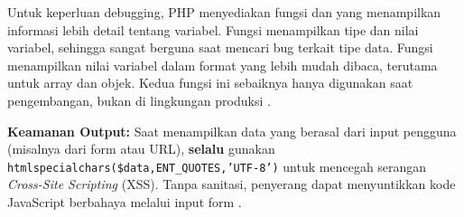 Untuk keperluan debugging, PHP menyediakan fungsi  dan  yang menampilkan informasi lebih detail tentang variabel. Fungsi  menampilkan tipe dan nilai variabel, sehingga sangat berguna saat mencari bug terkait tipe data. Fungsi  menampilkan nilai variabel dalam format yang lebih mudah dibaca, terutama untuk array dan objek. Kedua fungsi ini sebaiknya hanya digunakan saat pengembangan, bukan di lingkungan produksi \cite{phpRightWay}.

\begin{catatan}
\textbf{Keamanan Output:} Saat menampilkan data yang berasal dari input pengguna (misalnya dari form atau URL), \textbf{selalu} gunakan \texttt{htmlspecialchars(\$data,\allowbreak ENT\_QUOTES,\allowbreak 'UTF-8')} untuk mencegah serangan \textit{Cross-Site Scripting} (XSS). Tanpa sanitasi, penyerang dapat menyuntikkan kode JavaScript berbahaya melalui input form \cite{owaspXss}.
\end{catatan}

